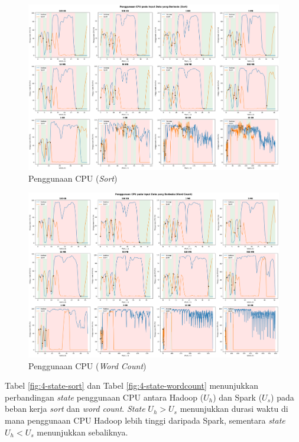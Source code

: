 \begin{landscape}
\begin{figure}[h]
    \centering
    \includegraphics[height=0.6\linewidth]{figures/ch04/4-penggunaan-cpu-all-sort.png}
    \caption{Penggunaan CPU (\textit{Sort})}
    \label{fig:4-penggunaan-cpu-all-sort}
\end{figure}
\end{landscape}

\begin{landscape}
\begin{figure}[h]
    \centering
    \includegraphics[height=0.6\linewidth]{figures/ch04/4-penggunaan-cpu-all-wordcount.png}
    \caption{Penggunaan CPU (\textit{Word Count})}
    \label{fig:4-penggunaan-cpu-all-wordcount}
\end{figure}
\end{landscape}

Tabel \ref{fig:4-state-sort} dan Tabel \ref{fig:4-state-wordcount} menunjukkan perbandingan \textit{state} penggunaan CPU antara Hadoop ($U_h$) dan Spark ($U_s$) pada beban kerja \textit{sort} dan \textit{word count}. \textit{State} $U_h > U_s$ menunjukkan durasi waktu di mana penggunaan CPU Hadoop lebih tinggi daripada Spark, sementara \textit{state} $U_h < U_s$ menunjukkan sebaliknya.

